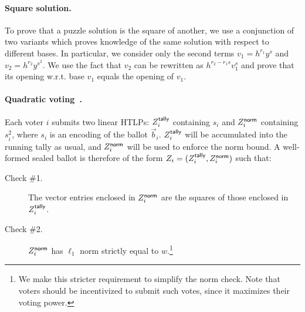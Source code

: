 

\paragraph{Square solution.} 
To prove that a puzzle solution is the square of another, we use a conjunction of two \zkpoks variants which proves knowledge of the same solution with respect to different bases. In particular, we consider only the second terms $v_1 = h^{r_1} y^s$ and $v_2 = h^{r_2} y^{s^2}$. We use the fact that $v_2$ can be rewritten as $h^{r_2 - r_1 s} v_1^s$ and prove that its opening w.r.t. base $v_1$ equals the opening of $v_1$.



% 




\paragraph{Quadratic voting~\cite{LalWey18}.}

Each voter $i$ submits two linear HTLPs: $Z_i^{\sf tally}$ containing $s_i$ and $Z_i^{\sf norm}$ containing $s_i^2$, where $s_i$ is an encoding of the ballot $\vec{b}_i$. $Z_i^{\sf tally}$ will be accumulated into the running tally as usual, and $Z_i^{\sf norm}$ will be used to enforce the norm bound. A well-formed sealed ballot is therefore of the form $Z_i = (Z_i^{\sf tally}, Z_i^{\sf norm})$ such that:
\begin{description}
    \item[Check \#1.] The vector entries enclosed in $Z_i^{\sf norm}$ are the squares of those enclosed in $Z_i^{\sf tally}$.
    \item[Check \#2.] $Z_i^{\sf norm}$ has $\ell_1$ norm strictly equal to $w$.\footnote{We make this stricter requirement to simplify the norm check. Note that voters should be incentivized to submit such votes, since it maximizes their voting power.}
\end{description}

